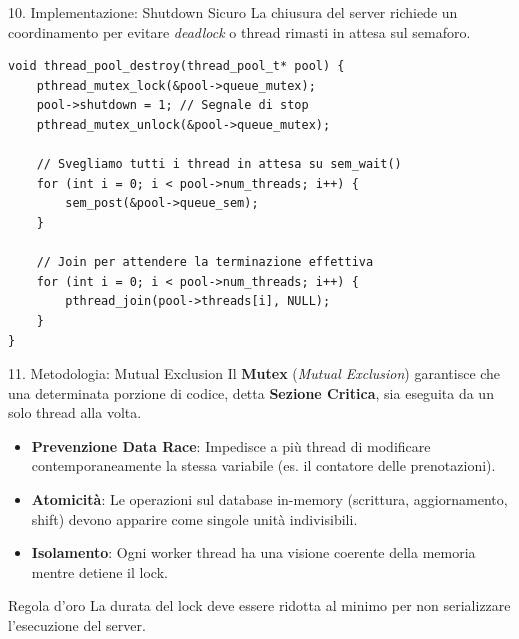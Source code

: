 \documentclass[aspectratio=169, 10pt]{beamer}
\begin{document}
\begin{frame}[fragile]{10. Implementazione: Shutdown Sicuro}
    La chiusura del server richiede un coordinamento per evitare \textit{deadlock} o thread rimasti in attesa sul semaforo.
    
\begin{lstlisting}[style=cstyle]
void thread_pool_destroy(thread_pool_t* pool) {
    pthread_mutex_lock(&pool->queue_mutex);
    pool->shutdown = 1; // Segnale di stop
    pthread_mutex_unlock(&pool->queue_mutex);

    // Svegliamo tutti i thread in attesa su sem_wait()
    for (int i = 0; i < pool->num_threads; i++) {
        sem_post(&pool->queue_sem);
    }

    // Join per attendere la terminazione effettiva
    for (int i = 0; i < pool->num_threads; i++) {
        pthread_join(pool->threads[i], NULL);
    }
}
\end{lstlisting}
\end{frame}

\begin{frame}{11. Metodologia: Mutual Exclusion}
    Il \textbf{Mutex} (\textit{Mutual Exclusion}) garantisce che una determinata porzione di codice, detta \textbf{Sezione Critica}, sia eseguita da un solo thread alla volta.
    
    \begin{itemize}
        \item \textbf{Prevenzione Data Race}: Impedisce a più thread di modificare contemporaneamente la stessa variabile (es. il contatore delle prenotazioni).
        \item \textbf{Atomicità}: Le operazioni sul database in-memory (scrittura, aggiornamento, shift) devono apparire come singole unità indivisibili.
        \item \textbf{Isolamento}: Ogni worker thread ha una visione coerente della memoria mentre detiene il lock.
    \end{itemize}
    
    \begin{block}{Regola d'oro}
        La durata del lock deve essere ridotta al minimo per non serializzare l'esecuzione del server.
    \end{block}
\end{frame}
\end{document}
